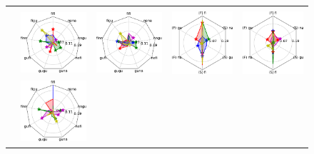 \begin{figure}[ht]
\begin{tabular}{lcccc}
\hspace{-4ex}
\\
\hspace{-4ex}
{}
\hspace{-4ex}
&{\includegraphics[width=.23\linewidth]{figures/part_II/roi_plots/TP/Vis/radial_word.pdf}}
\hspace{-4ex}
&{\includegraphics[width=.23\linewidth]{figures/part_II/roi_plots/TP/Aud/radial_word.pdf}}
\hspace{-4ex}
&{\includegraphics[width=.23\linewidth]{figures/part_II/roi_plots/TP/Vis/radial_joint.pdf}}
\hspace{-4ex}
&{\includegraphics[width=.23\linewidth]{figures/part_II/roi_plots/TP/Aud/radial_joint.pdf}}
\hspace{-4ex}
\\
\hspace{-4ex}
{}
\hspace{-4ex}
&{\includegraphics[width=.23\linewidth]{figures/part_II/roi_plots/TPJ/Vis/radial_word.pdf}}

\end{tabular}
\end{figure}
